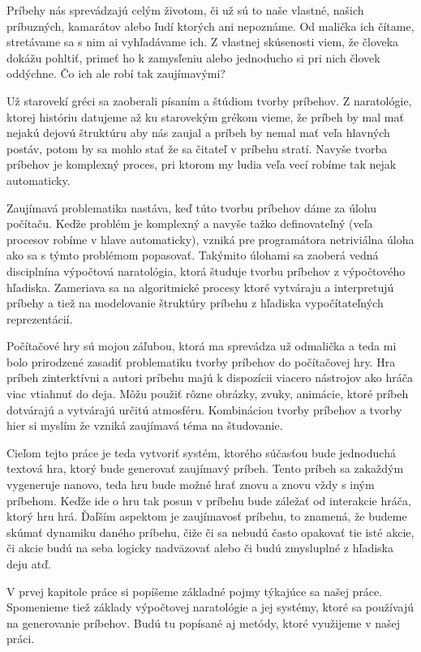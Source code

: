 Príbehy nás sprevádzajú celým životom, či už sú to naše vlastné, našich príbuzných, kamarátov alebo ľudí ktorých ani nepoznáme. Od malička ich čítame, stretávame sa s nim ai vyhľadávame ich. Z vlastnej skúsenosti viem, že človeka dokážu pohltiť, primeť ho k zamysľeniu alebo jednoducho si pri nich človek oddýchne. Čo ich ale robí tak zaujímavými?\par
Už starovekí gréci sa zaoberali písaním a štúdiom tvorby príbehov. Z naratológie, ktorej históriu datujeme až ku starovekým grékom vieme, že príbeh by mal mať nejakú dejovú štruktúru aby nás zaujal a príbeh by nemal mať veľa hlavných postáv, potom by sa mohlo stať že sa čitateľ v príbehu stratí. Navyše tvorba príbehov je komplexný proces, pri ktorom my ludia veľa vecí robíme tak nejak automaticky.\par
Zaujímavá problematika nastáva, keď túto tvorbu príbehov dáme za úlohu počítaču. Keďže problém je komplexný a navyše tažko definovateľný (veľa procesov robíme v hlave automaticky), vzniká pre programátora netriviálna úloha ako sa s týmto problémom popasovať. Takýmito úlohami sa zaoberá vedná disciplnína výpočtová naratológia, ktorá študuje tvorbu príbehov z výpočtového hľadiska. Zameriava sa na algoritmické procesy ktoré vytváraju a interpretujú príbehy a tiež na modelovanie štruktúry príbehu z hľadiska vypočítateľných reprezentácií.\par
Počítačové hry sú mojou záľubou, ktorá ma sprevádza už odmalička a teda mi bolo prirodzené zasadiť problematiku tvorby príbehov do počítačovej hry. Hra príbeh zinterktívni a autori príbehu majú k dispozícii viacero nástrojov ako hráča viac vtiahnuť do deja. Môžu použiť rôzne obrázky, zvuky, animácie, ktoré príbeh dotvárajú a vytvárajú určitú atmosféru. Kombináciou tvorby príbehov a tvorby hier si myslím že vzniká zaujímavá téma na študovanie.\par
Cieľom tejto práce je teda vytvoriť systém, ktorého súčasťou bude jednoduchá textová hra, ktorý bude generovať zaujímavý príbeh. Tento príbeh sa zakaždým vygeneruje nanovo, teda hru bude možné hrať znovu a znovu vždy s iným príbehom. Keďže ide o hru tak posun v príbehu bude záležať od interakcie hráča, ktorý hru hrá. Ďaľším aspektom je zaujímavosť príbehu, to znamená, že budeme skúmať dynamiku daného príbehu, čiže či sa nebudú často opakovať tie isté akcie, či akcie budú na seba logicky nadväzovať alebo či budú zmysluplné z hľadiska deju atď.\par
V prvej kapitole práce si popíšeme základné pojmy týkajúce sa našej práce. Spomenieme tiež základy výpočtovej naratológie a jej systémy, ktoré sa používajú na generovanie príbehov. Budú tu popísané aj metódy, ktoré využijeme v našej práci.\par
